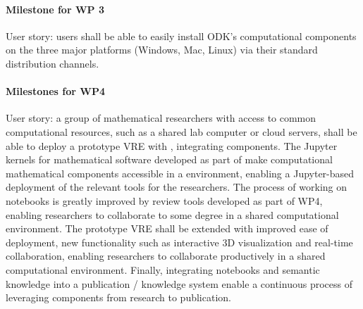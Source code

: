 \paragraph{Milestone for WP 3}

\begin{milestones}
  {User story: users shall be able to easily install ODK's
    computational components on the three major platforms (Windows,
    Mac, Linux) via their standard distribution channels.}

\end{milestones}

\paragraph{Milestones for WP4}

\begin{milestones}
  {
  User story: a group of mathematical researchers with access to
  common computational resources, such as a shared lab computer or
  cloud servers, shall be able to deploy a prototype VRE with
  \JupyterHub, integrating \ODK components.
  The Jupyter kernels for mathematical software developed as part of \ODK
  make computational mathematical components accessible in a \Jupyter
  environment, enabling a Jupyter-based deployment of the relevant
  tools for the researchers.
  The process of working on notebooks is greatly improved by review tools
  developed as part of WP4,
  enabling researchers to collaborate to some degree
  in a shared computational environment.
  }
  {
  The prototype VRE shall be extended with improved ease of deployment, new
  functionality such as interactive 3D visualization and real-time
  collaboration, enabling researchers to collaborate productively in a shared
  computational environment. Finally, integrating notebooks and semantic
  knowledge into a publication / knowledge system enable a continuous process
  of leveraging \ODK components from research to publication.
  }
\end{milestones}

